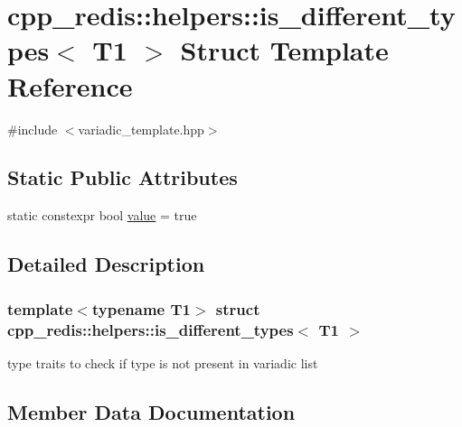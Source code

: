 \hypertarget{structcpp__redis_1_1helpers_1_1is__different__types_3_01_t1_01_4}{}\section{cpp\+\_\+redis\+:\+:helpers\+:\+:is\+\_\+different\+\_\+types$<$ T1 $>$ Struct Template Reference}
\label{structcpp__redis_1_1helpers_1_1is__different__types_3_01_t1_01_4}


{\ttfamily \#include $<$variadic\+\_\+template.\+hpp$>$}

\subsection*{Static Public Attributes}
\begin{DoxyCompactItemize}
\item 
static constexpr bool \mbox{\hyperlink{structcpp__redis_1_1helpers_1_1is__different__types_3_01_t1_01_4_ae05b9b4af6846340ac66fcf64a622397}{value}} = true
\end{DoxyCompactItemize}


\subsection{Detailed Description}
\subsubsection*{template$<$typename T1$>$\newline
struct cpp\+\_\+redis\+::helpers\+::is\+\_\+different\+\_\+types$<$ T1 $>$}

type traits to check if type is not present in variadic list 

\subsection{Member Data Documentation}
\mbox{\label{structcpp__redis_1_1helpers_1_1is__different__types_3_01_t1_01_4_ae05b9b4af6846340ac66fcf64a622397}} 
